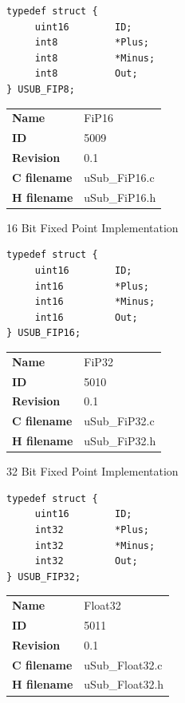 \begin{lstlisting}
typedef struct {
     uint16        ID;
     int8          *Plus;
     int8          *Minus;
     int8          Out;
} USUB_FIP8;
\end{lstlisting}

\ifdefined \AddTestReports
{}
\fi
{}
\nopagebreak[0]
\begin{tabular}{l l}
\textbf{Name} & FiP16 \tabularnewline
\textbf{ID} & 5009 \tabularnewline
\textbf{Revision} & 0.1 \tabularnewline
\textbf{C filename} & uSub\_FiP16.c \tabularnewline
\textbf{H filename} & uSub\_FiP16.h \tabularnewline
\end{tabular}
\vspace{1ex}

16 Bit Fixed Point Implementation

\begin{lstlisting}
typedef struct {
     uint16        ID;
     int16         *Plus;
     int16         *Minus;
     int16         Out;
} USUB_FIP16;
\end{lstlisting}

\ifdefined \AddTestReports
{}
\fi
{}
\nopagebreak[0]
\begin{tabular}{l l}
\textbf{Name} & FiP32 \tabularnewline
\textbf{ID} & 5010 \tabularnewline
\textbf{Revision} & 0.1 \tabularnewline
\textbf{C filename} & uSub\_FiP32.c \tabularnewline
\textbf{H filename} & uSub\_FiP32.h \tabularnewline
\end{tabular}
\vspace{1ex}

32 Bit Fixed Point Implementation

\begin{lstlisting}
typedef struct {
     uint16        ID;
     int32         *Plus;
     int32         *Minus;
     int32         Out;
} USUB_FIP32;
\end{lstlisting}

\ifdefined \AddTestReports
{}
\fi
{}
\nopagebreak[0]
\begin{tabular}{l l}
\textbf{Name} & Float32 \tabularnewline
\textbf{ID} & 5011 \tabularnewline
\textbf{Revision} & 0.1 \tabularnewline
\textbf{C filename} & uSub\_Float32.c \tabularnewline
\textbf{H filename} & uSub\_Float32.h \tabularnewline
\end{tabular}
\vspace{1ex}

